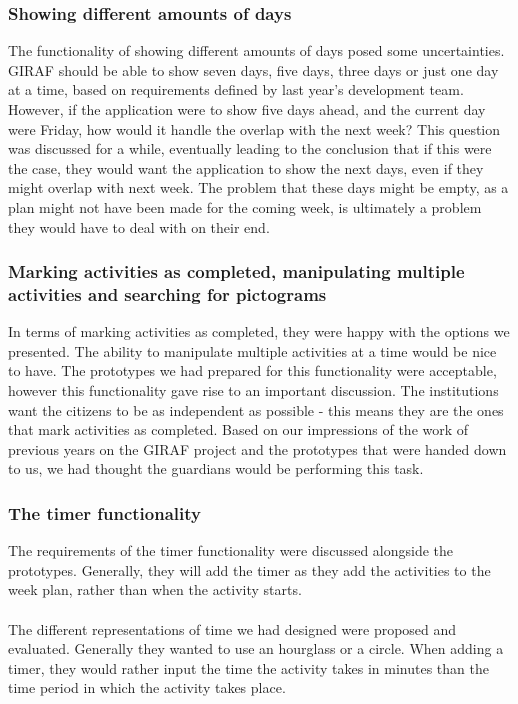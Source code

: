 \subsubsection{Showing different amounts of days}
The functionality of showing different amounts of days posed some uncertainties.
GIRAF should be able to show seven days, five days, three days or just one day at a time, based on requirements defined by last year's development team.
However, if the application were to show five days ahead, and the current day were Friday, how would it handle the overlap with the next week?
This question was discussed for a while, eventually leading to the conclusion that if this were the case, they would want the application to show the next days, even if they might overlap with next week.
The problem that these days might be empty, as a plan might not have been made for the coming week, is ultimately a problem they would have to deal with on their end.

\subsubsection{Marking activities as completed, manipulating multiple activities and searching for pictograms}
In terms of marking activities as completed, they were happy with the options we presented.
The ability to manipulate multiple activities at a time would be nice to have.
The prototypes we had prepared for this functionality were acceptable, however this functionality gave rise to an important discussion.
The institutions want the citizens to be as independent as possible - this means they are the ones that mark activities as completed.
Based on our impressions of the work of previous years on the GIRAF project and the prototypes that were handed down to us, we had thought the guardians would be performing this task.

\subsubsection{The timer functionality}
The requirements of the timer functionality were discussed alongside the prototypes.
Generally, they will add the timer as they add the activities to the week plan, rather than when the activity starts.
\\\\
The different representations of time we had designed were proposed and evaluated.
Generally they wanted to use an hourglass or a circle.
When adding a timer, they would rather input the time the activity takes in minutes than the time period in which the activity takes place.

